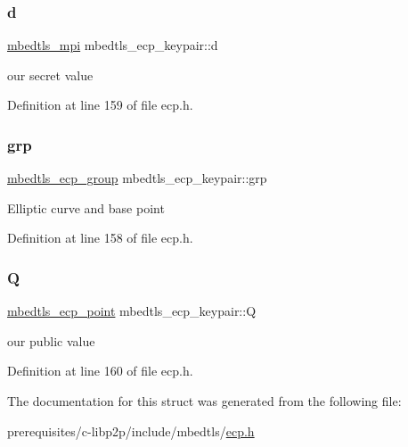 \subsubsection{\texorpdfstring{d}{d}}
{\footnotesize\ttfamily \mbox{\hyperlink{structmbedtls__mpi}{mbedtls\+\_\+mpi}} mbedtls\+\_\+ecp\+\_\+keypair\+::d}

our secret value 

Definition at line 159 of file ecp.\+h.

\mbox{\label{structmbedtls__ecp__keypair_ab5b77c1c63b7396b6869545b121d8828}} 
\subsubsection{\texorpdfstring{grp}{grp}}
{\footnotesize\ttfamily \mbox{\hyperlink{structmbedtls__ecp__group}{mbedtls\+\_\+ecp\+\_\+group}} mbedtls\+\_\+ecp\+\_\+keypair\+::grp}

Elliptic curve and base point 

Definition at line 158 of file ecp.\+h.

\mbox{\label{structmbedtls__ecp__keypair_a30cb41708701bb9ed9bdba5972a2ccea}} 
\subsubsection{\texorpdfstring{Q}{Q}}
{\footnotesize\ttfamily \mbox{\hyperlink{structmbedtls__ecp__point}{mbedtls\+\_\+ecp\+\_\+point}} mbedtls\+\_\+ecp\+\_\+keypair\+::Q}

our public value 

Definition at line 160 of file ecp.\+h.



The documentation for this struct was generated from the following file\+:\begin{DoxyCompactItemize}
\item 
prerequisites/c-\/libp2p/include/mbedtls/\mbox{\hyperlink{ecp_8h}{ecp.\+h}}\end{DoxyCompactItemize}
